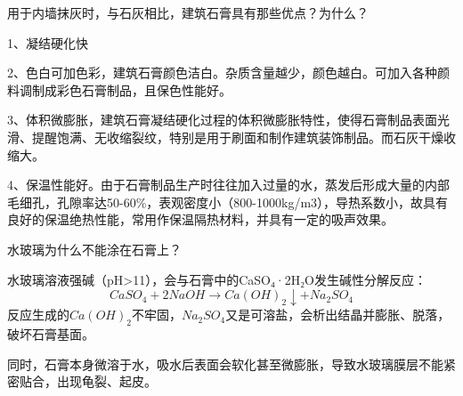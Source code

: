 \documentclass[12pt, a4paper, oneside, UTF8]{ctexbook}
\begin{document}
\begin{example}
用于内墙抹灰时，与石灰相比，建筑石膏具有那些优点？为什么？

1、凝结硬化快

2、色白可加色彩，建筑石膏颜色洁白。杂质含量越少，颜色越白。可加入各种颜料调制成彩色石膏制品，且保色性能好。

3、体积微膨胀，建筑石膏凝结硬化过程的体积微膨胀特性，使得石膏制品表面光滑、提醒饱满、无收缩裂纹，特别是用于刷面和制作建筑装饰制品。而石灰干燥收缩大。

4、保温性能好。由于石膏制品生产时往往加入过量的水，蒸发后形成大量的内部毛细孔，孔隙率达50-60\%，表观密度小（800-1000kg/m3），导热系数小，故具有良好的保温绝热性能，常用作保温隔热材料，并具有一定的吸声效果。
\end{example}

\begin{example}
    水玻璃为什么不能涂在石膏上？

    水玻璃溶液强碱（pH>11），会与石膏中的CaSO₄·2H₂O发生碱性分解反应：
    $$CaSO_4 + 2NaOH \longrightarrow Ca(OH)_2 \downarrow + Na_2SO_4$$
    反应生成的$Ca(OH)_2$不牢固，$Na_2SO_4$又是可溶盐，会析出结晶并膨胀、脱落，破坏石膏基面。

    同时，石膏本身微溶于水，吸水后表面会软化甚至微膨胀，导致水玻璃膜层不能紧密贴合，出现龟裂、起皮。
\end{example}

\ifx\allfiles\undefined
\end{document}

